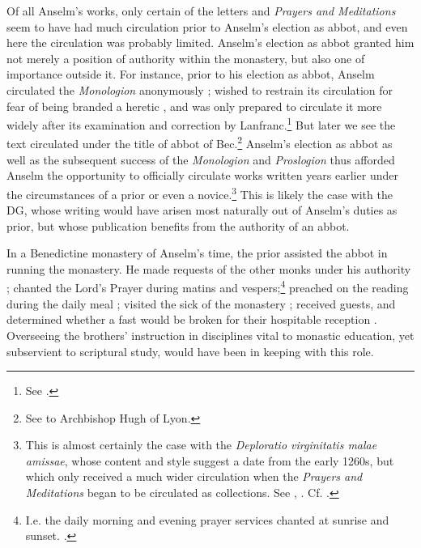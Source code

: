 \documentclass[]{article}
\begin{document}
Of all Anselm's works, only certain of the letters and \textit{Prayers and Meditations} seem to have had much circulation prior to Anselm's election as abbot, and even here the circulation was probably limited. Anselm's election as abbot granted him not merely a position of authority within the monastery, but also one of importance outside it. For instance, prior to his election as abbot, Anselm circulated the \textit{Monologion} anonymously \cite[\textit{pros.} prol.]{AnselmPros}; wished to restrain its circulation for fear of being branded a heretic \cite[Ep. 83, pp. 217-218]{Anselm1990}, and was only prepared to circulate it more widely after its examination and correction by Lanfranc.\footnote{See \cite[Ep. 72, pp. 197-98; Ep. 74, pp, 201-202; Ep. 77, pp. 205-207]{Anselm1990}.} But later we see the text circulated under the title of abbot of Bec.\footnote{See \cite[Ep. 100, pp. 250-251]{Anselm1990} to Archbishop Hugh of Lyon.}  Anselm's election as abbot as well as the subsequent success of the \textit{Monologion} and \textit{Proslogion} thus afforded Anselm the opportunity to officially circulate works written years earlier under the circumstances of a prior or even a novice.\footnote{This is almost certainly the case with the \textit{Deploratio virginitatis malae amissae}, whose content and style suggest a date from the early 1260s, but which only received a much wider circulation when the \textit{Prayers and Meditations} began to be circulated as collections. See \cite[pp. 45-46]{Southern1963}, \cite[p. 105]{Southern1990}. Cf. \cite[p. 13]{Sharpe2009}.} This is likely the case with the DG, whose writing would have arisen most naturally out of Anselm's duties as prior, but whose publication benefits from the authority of an abbot.

In a Benedictine monastery of Anselm's time, the prior assisted the abbot in running the monastery. He made requests of the other monks under his authority \cite[RSB ch. 6, 7]{RSB}; chanted the Lord's Prayer during matins and vespers;\footnote{I.e. the daily morning and evening prayer services chanted at sunrise and sunset. \cite[RSB ch. 13]{RSB}.} preached on the reading during the daily meal \cite[RSB ch. 38]{RSB}; visited the sick of the monastery \cite[\textit{Decreta}, ch. 3]{LanfrancDecreta}; received guests, and determined whether a fast would be broken for their hospitable reception \cite[RSB ch. 53]{RSB}. Overseeing the brothers' instruction in disciplines vital to monastic education, yet subservient to scriptural study, would have been in keeping with this role.
\end{document}

